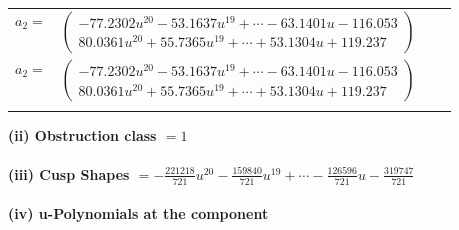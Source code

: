 \documentclass[1p]{elsarticle_modified}
\theoremstyle{definition}
\begin{document}
\begin{tabular}{m{7pt} m{180pt} m{7pt} m{180pt} }
\flushright $a_{2}=$&$\begin{pmatrix}-77.2302 u^{20}-53.1637 u^{19}+\cdots-63.1401 u-116.053\\80.0361 u^{20}+55.7365 u^{19}+\cdots+53.1304 u+119.237\end{pmatrix}$\\ \flushright $a_{2}=$&$\begin{pmatrix}-77.2302 u^{20}-53.1637 u^{19}+\cdots-63.1401 u-116.053\\80.0361 u^{20}+55.7365 u^{19}+\cdots+53.1304 u+119.237\end{pmatrix}$\\&\end{tabular}
\flushleft \textbf{(ii) Obstruction class $= 1$}\\~\\
\flushleft \textbf{(iii) Cusp Shapes $= -\frac{221218}{721} u^{20}-\frac{159840}{721} u^{19}+\cdots-\frac{126596}{721} u-\frac{319747}{721}$}\\~\\
\newpage\renewcommand{\arraystretch}{1}
\flushleft \textbf{(iv) u-Polynomials at the component}\newline \\
\end{document}
